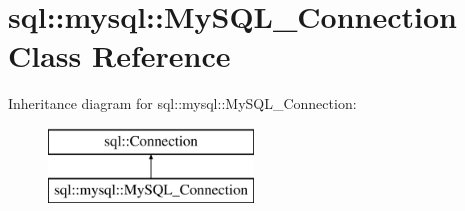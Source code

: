 \hypertarget{classsql_1_1mysql_1_1_my_s_q_l___connection}{}\section{sql\+:\+:mysql\+:\+:My\+S\+Q\+L\+\_\+\+Connection Class Reference}
\label{classsql_1_1mysql_1_1_my_s_q_l___connection}
Inheritance diagram for sql\+:\+:mysql\+:\+:My\+S\+Q\+L\+\_\+\+Connection\+:\begin{figure}[H]
\begin{center}
\leavevmode
\includegraphics[height=2.000000cm]{classsql_1_1mysql_1_1_my_s_q_l___connection}
\end{center}
\end{figure}
